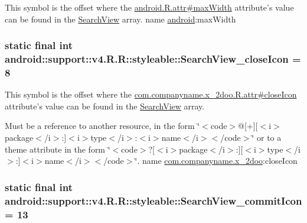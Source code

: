This symbol is the offset where the \hyperlink{}{android.R.attr\#maxWidth} attribute's value can be found in the \hyperlink{classandroid_1_1support_1_1v4_1_1_r_1_1styleable_63a589da97c59fb7eebd9759edb31f0d}{SearchView} array.  name \hyperlink{namespaceandroid}{android}:maxWidth \hypertarget{classandroid_1_1support_1_1v4_1_1_r_1_1styleable_604e593d78318f98842bc75b6f058c85}{
\subsubsection[{SearchView\_\-closeIcon}]{\setlength{\rightskip}{0pt plus 5cm}static final int android::support::v4.R.R::styleable::SearchView\_\-closeIcon = 8}}
\label{classandroid_1_1support_1_1v4_1_1_r_1_1styleable_604e593d78318f98842bc75b6f058c85}


This symbol is the offset where the \hyperlink{classcom_1_1companyname_1_1x__2doo_1_1_r_1_1attr_06ea3e8c4d93a289db4a83a950c2b7e6}{com.companyname.x\_\-2doo.R.attr\#closeIcon} attribute's value can be found in the \hyperlink{classandroid_1_1support_1_1v4_1_1_r_1_1styleable_63a589da97c59fb7eebd9759edb31f0d}{SearchView} array.

Must be a reference to another resource, in the form \char`\"{}$<$code$>$@\mbox{[}+\mbox{]}\mbox{[}$<$i$>$package$<$/i$>$:\mbox{]}$<$i$>$type$<$/i$>$:$<$i$>$name$<$/i$>$$<$/code$>$\char`\"{} or to a theme attribute in the form \char`\"{}$<$code$>$?\mbox{[}$<$i$>$package$<$/i$>$:\mbox{]}\mbox{[}$<$i$>$type$<$/i$>$:\mbox{]}$<$i$>$name$<$/i$>$$<$/code$>$\char`\"{}.  name \hyperlink{namespacecom_1_1companyname_1_1x__2doo}{com.companyname.x\_\-2doo}:closeIcon \hypertarget{classandroid_1_1support_1_1v4_1_1_r_1_1styleable_7596f400f76fad60028392a5d9d8e462}{
\subsubsection[{SearchView\_\-commitIcon}]{\setlength{\rightskip}{0pt plus 5cm}static final int android::support::v4.R.R::styleable::SearchView\_\-commitIcon = 13}}
\label{classandroid_1_1support_1_1v4_1_1_r_1_1styleable_7596f400f76fad60028392a5d9d8e462}


